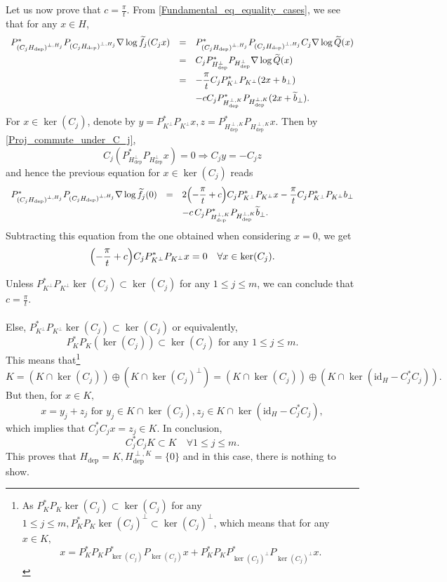 \documentclass[11pt,a4paper,reqno]{amsart}
\numberwithin{equation}{section}
\theoremstyle{definition}
\newcommand{\nm}{\noalign{\smallskip}}
\newcommand{\ds}{\displaystyle}
\renewcommand{\tilde}{\widetilde}
\newcommand{\<}{\ensuremath \leq}
\renewcommand{\>}{\ensuremath \geq}
\renewcommand{\tilde}{\widetilde}
\begin{document}
Let us now prove that $c=\frac{\pi}{t}$.
From \cref{Fundamental_eq_equality_cases}, we see that for any $x \in H$, $$\begin{array}{lll}
    P_{(C_jH_{\mathrm {dep}})^{\perp,H_j}}^*P_{(C_jH_{\mathrm{dep}})^{\perp,H_j}}\nabla \log \tilde f_j(C_jx) &=& P_{(C_jH_{\mathrm {dep}})^{\perp,H_j}}^*P_{(C_jH_{\mathrm{dep}})^{\perp,H_j}}C_j\nabla \log \tilde Q(x)
    \\
    \nm 
    &=& C_jP_{H_{\mathrm{dep}}^\perp}^*P_{H_{\mathrm{dep}}^\perp}\nabla \log \tilde Q(x) \\
    \nm 
    &=& \ds -\frac{\pi}{t} C_jP_{K^\perp}^*P_{K^\perp}(2x+b_\perp) \\
    \nm 
    && \ds -c C_jP_{H_\mathrm{dep}^{\perp,K}}^*P_{H_{\mathrm{dep}}^{\perp,K}}(2x+\tilde b_\perp).\end{array}$$ For $x \in \ker(C_j)$, denote by $y=P_{K^\perp}^*P_{K^\perp}x, z=P_{H_{\mathrm{dep}}^{\perp,K}}^*P_{H_{\mathrm{dep}}^{\perp,K}}x.$ Then by \cref{Proj_commute_under_C_j}, $$C_j(P_{H_\mathrm{dep}^{\perp}}^*P_{H_\mathrm{dep}^{\perp}}x)=0 \Longrightarrow C_jy=-C_jz$$ and hence the previous equation for $x \in \ker(C_j)$ reads $$\begin{array}{lll}P_{(C_jH_{\mathrm {dep}})^{\perp,H_j}}^*P_{(C_jH_{\mathrm{dep}})^{\perp,H_j}}\nabla \log \tilde f_j(0) &=& \ds 2\Bigl(-\frac{\pi}{t}+c \Bigl)C_jP_{K^\perp}^*P_{K^\perp}x-\frac{\pi}{t} C_jP_{K^\perp}^*P_{K^\perp}b_\perp \\
    \nm 
    && \ds -c \, C_jP_{H_\mathrm{dep}^{\perp,K}}^*P_{H_{\mathrm{dep}}^{\perp,K}}\tilde b_\perp.\end{array}$$ Subtracting this equation from the one obtained when considering $x=0$, we get $$\Bigl(-\frac{\pi}{t}+c \Bigl)C_jP_{K^\perp}^*P_{K^\perp}x=0 \quad \forall x \in \ker(C_j).$$
    
    Unless $P_{K^\perp}^*P_{K^\perp}\ker(C_j) \subset \ker(C_j)$ for any $1 \leq j \leq m$, we can conclude that $c=\frac{\pi}{t}.$ \hfill \\ \\ Else, $P_{K^\perp}^*P_{K^\perp}\ker(C_j) \subset \ker(C_j)$ or equivalently, $$P_K^*P_K(\ker(C_j)) \subset \ker(C_j) \text{ for any } 1 \leq j \leq m.$$ 
    This means that\footnote{As $P_K^*P_K\ker(C_j) \subset \ker(C_j)$ for any $1 \leq j \leq m, P_K^*P_K\ker(C_j)^\perp \subset \ker(C_j)^\perp$, which means that for any $x \in K,$ $$ x=P_K^*P_KP_{\ker(C_j)}^*P_{\ker(C_j)}x+P_K^*P_KP_{\ker(C_j)^\perp}^*P_{\ker(C_j)^\perp}x.$$} $$K=(K \cap \ker(C_j))\oplus (K \cap \ker(C_j)^\perp)=(K \cap \ker(C_j)) \oplus (K \cap \ker(\mathrm{id}_H-C_j^*C_j)).$$ But then, for $x \in K,$ $$ x=y_j+z_j \text{ for } y_j \in K \cap \ker(C_j), z_j \in K \cap \ker(\mathrm{id}_H-C_j^*C_j),$$ which implies that $C_j^*C_jx=z_j \in K.$ In conclusion, $$C_j^*C_jK \subset K \quad \forall 1 \leq j \leq m.$$ This proves that $H_{\mathrm{dep}}=K, H_{\mathrm{dep}}^{\perp,K}=\{0\}$ and in this case, there is nothing to show.   \hfill \\
    
\end{document}
